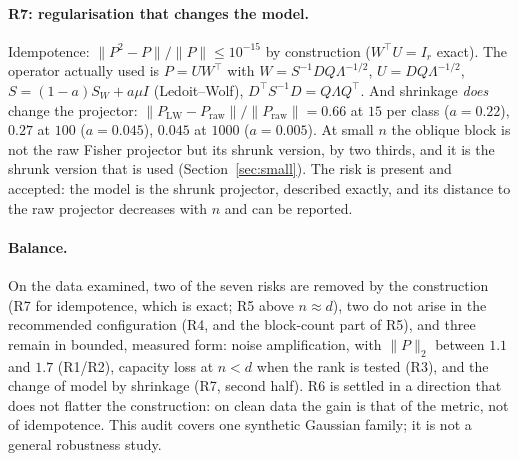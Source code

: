 \documentclass[11pt,a4paper]{article}
\theoremstyle{plain}
\theoremstyle{definition}
\theoremstyle{remark}
\newcommand{\T}{\top}
\begin{document}
\paragraph{R7: regularisation that changes the model.} Idempotence:
$\|P^2-P\|/\|P\|\le10^{-15}$ by construction ($W^\T U=I_r$ exact). The
operator actually used is $P=UW^\T$ with $W=S^{-1}DQ\Lambda^{-1/2}$,
$U=DQ\Lambda^{-1/2}$, $S=(1-a)S_W+a\mu I$ (Ledoit--Wolf),
$D^\T S^{-1}D=Q\Lambda Q^\T$. And shrinkage \emph{does} change the
projector: $\|P_{\mathrm{LW}}-P_{\mathrm{raw}}\|/\|P_{\mathrm{raw}}\|=0.66$ at
$15$ per class ($a=0.22$), $0.27$ at $100$ ($a=0.045$), $0.045$ at $1000$
($a=0.005$). At small $n$ the oblique block is not the raw Fisher projector
but its shrunk version, by two thirds, and it is the shrunk version that
is used (Section~\ref{sec:small}). The risk is present and accepted: the
model is the shrunk projector, described exactly, and its distance to the
raw projector decreases with $n$ and can be reported.

\paragraph{Balance.} On the data examined, two of the seven risks are
removed by the construction (R7 for idempotence, which is exact; R5 above
$n\approx d$), two do not arise in the recommended configuration (R4, and
the block-count part of R5), and three remain in bounded, measured form: noise
amplification, with $\|P\|_2$ between $1.1$ and $1.7$ (R1/R2), capacity loss
at $n<d$ when the rank is tested (R3), and the change of model by shrinkage
(R7, second half). R6 is settled in a direction that does not flatter the
construction: on clean data the gain is that of the metric, not of
idempotence. This audit covers one synthetic Gaussian family; it is not a
general robustness study.

\end{document}
